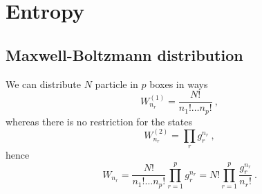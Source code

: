 \chapter{Entropy}

\section{Maxwell-Boltzmann distribution}

    We can distribute $N$ particle in $p$ boxes in ways 
    \begin{equation*}
        W^{(1)}_{n_r} = \frac{N!}{n_1! \ldots n_p!} ~,
    \end{equation*}
    whereas there is no restriction for the states 
    \begin{equation*}
        W^{(2)}_{n_r} = \prod_r g_r^{n_r} ~,
    \end{equation*}
    hence 
    \begin{equation*}
        W_{n_r} = \frac{N!}{n_1! \ldots n_p!} \prod_{r=1}^p g_r^{n_r} = N! \prod_{r=1}^p \frac{g_r^{n_r}}{n_r!} ~.
    \end{equation*}

